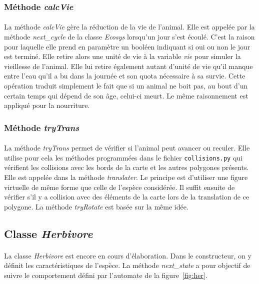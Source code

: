 \documentclass[a4paper,11pt,final,oneside]{article}
\begin{document}
			\subsubsection{Méthode \textit{calcVie}}
			
\paragraph{} La méthode \textit{calcVie} gère la réduction de la vie de l'animal. Elle est appelée par la méthode \textit{next\_cycle} de la classe \textit{Ecosys} lorsqu'un jour s'est écoulé. C'est la raison pour laquelle elle prend en paramètre un booléen indiquant si oui ou non le jour est terminé. Elle retire alors une unité de vie à la variable \textit{vie} pour simuler la vieillesse de l'animal. Elle lui retire également autant d'unité de vie qu'il manque entre l'eau qu'il a bu dans la journée et son quota nécessaire à sa survie. Cette opération traduit simplement le fait que si un animal ne boit pas, au bout d'un certain temps qui dépend de son âge, celui-ci meurt. Le même raisonnement est appliqué pour la nourriture.

			\subsubsection{Méthode \textit{tryTrans}}

\paragraph{} La méthode \textit{tryTrans} permet de vérifier si l'animal peut avancer ou reculer. Elle utilise pour cela les méthodes programmées dans le fichier \texttt{collisions.py} qui vérifient les collisions avec les bords de la carte et les autres polygones présents. Elle est appelée dans la méthode \textit{translater}. Le principe est d'utiliser une figure virtuelle de même forme que celle de l'espèce considérée. Il suffit ensuite de vérifier s'il y a collision avec des éléments de la carte lors de la translation de ce polygone. La méthode \textit{tryRotate} est basée sur la même idée.

		\subsection{Classe \textit{Herbivore}}
		
\paragraph{} La classe \textit{Herbivore} est encore en cours d'élaboration. Dans le constructeur, on y définit les caractéristiques de l'espèce. La méthode \textit{next\_state} a pour objectif de suivre le comportement défini par l'automate de la figure~\ref{fig:her}.
\end{document}
